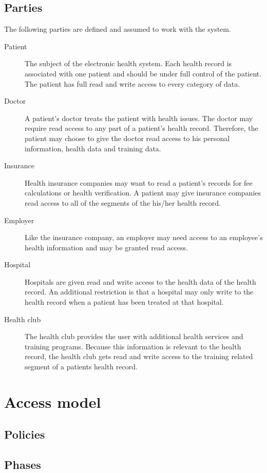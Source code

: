 \documentclass[a4paper]{article}
\begin{document}
	\subsection{Parties}
		The following parties are defined and assumed to work with the system.
		
		\begin{description}
			\item[Patient] The subject of the electronic health system. Each health record is associated with one patient and should be under full control of the patient. The patient has full read and write access to every category of data.
			\item[Doctor] A patient's doctor treats the patient with health issues. The doctor may require read access to any part of a patient's health record. Therefore, the patient may choose to give the doctor read access to his personal information, health data and training data.
			\item[Insurance] Health insurance companies may want to read a patient's records for fee calculations or health verification. A patient may give insurance companies read access to all of the segments of the his/her health record.
			\item[Employer] Like the insurance company, an employer may need access to an employee's health information and may be granted read access.  
			\item[Hospital] Hospitals are given read and write access to the health data of the health record. An additional restriction is that a hospital may only write to the health record when a patient has been treated at that hospital.
			\item[Health club] The health club provides the user with additional health services and training programs. Because this information is relevant to the health record, the health club gets read and write access to the training related segment of a patients health record.
		\end{description}

\section{Access model}
	\subsection{Policies}
	
	\subsection{Phases}
\end{document}
